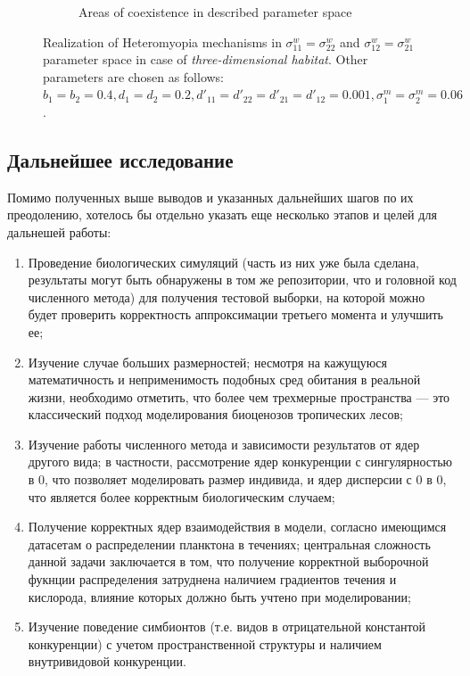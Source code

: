 \begin{figure}[ht]
\begin{subfigure}{.5\textwidth}
	\caption{Areas of coexistence in described parameter space}
	\label{fig:hmd3:sub4}
\end{subfigure}
	\caption{Realization of Heteromyopia mechanisms in  $\sigma_{11}^{w}=\sigma_{22}^{w}$ and $\sigma_{12}^{w}=\sigma_{21}^{w}$ parameter space in case of \emph{three-dimensional habitat}. Other parameters are chosen as follows: $b_{1}=b_{2}=0.4
		, d_{1}=d_{2}=0.2
		, d'_{11}=d'_{22}=d'_{21}=d'_{12}=0.001,
		\sigma_{1}^{m}=\sigma_{2}^{m}=0.06$. }
	\label{fig:hmd3}
\end{figure}


\subsection{Дальнейшее исследование}

Помимо полученных выше выводов и указанных дальнейших шагов по их преодолению, хотелось бы отдельно указать еще несколько этапов и целей для дальнешей работы:

\begin{enumerate}
	
\item Проведение биологических симуляций (часть из них уже была сделана, результаты могут быть обнаружены в том же репозитории, что и головной код численного метода) для получения тестовой выборки, на которой можно будет проверить корректность аппроксимации третьего момента и улучшить ее;

\item  Изучение случае больших размерностей; несмотря на кажущуюся математичность и неприменимость подобных сред обитания в реальной жизни, необходимо отметить, что более чем трехмерные пространства — это классический подход моделирования биоценозов тропических лесов;

\item Изучение работы численного метода и зависимости результатов от ядер другого вида; в частности, рассмотрение ядер конкуренции с сингулярностью в 0, что позволяет моделировать размер индивида, и ядер дисперсии с 0 в 0, что является более корректным биологическим случаем;

\item Получение корректных ядер взаимодействия в модели, согласно имеющимся датасетам о распределении планктона в течениях; центральная сложность данной задачи заключается в том, что получение корректной выборочной фукнции распределения затруднена наличием градиентов течения и кислорода, влияние которых должно быть учтено при моделировании;

\item Изучение поведение симбионтов (т.е. видов в отрицательной константой конкуренции) с учетом пространственной структуры и наличием внутривидовой конкуренции.

\end{enumerate}